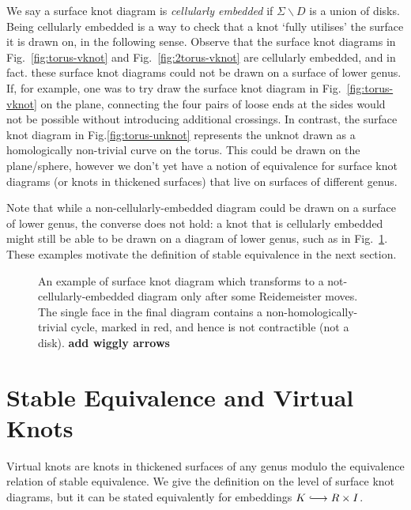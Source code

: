 \documentclass[12pt]{report}
\newcommand{\inject}{\lhook\joinrel\longrightarrow}
\newcommand{\notered}[1]{{\color{Red} \textbf{#1}}}
\begin{document}
We say a surface knot diagram is \textit{cellularly embedded} if $\Sigma \smallsetminus D$ is a union of disks. Being cellularly embedded is a way to check that a knot `fully utilises' the surface it is drawn on, in the following sense. Observe that the surface knot diagrams in Fig.~\ref{fig:torus-vknot} and Fig.~\ref{fig:2torus-vknot} are cellularly embedded, and in fact. these surface knot diagrams could not be drawn on a surface of lower genus. If, for example, one was to try draw the surface knot diagram in Fig.~\ref{fig:torus-vknot} on the plane, connecting the four pairs of loose ends at the sides would not be possible without introducing additional crossings. In contrast, the surface knot diagram in Fig.\ref{fig:torus-unknot} represents the unknot drawn as a homologically non-trivial curve on the torus. This could be drawn on the plane/sphere, however we don't yet have a notion of equivalence for surface knot diagrams (or knots in thickened surfaces) that live on surfaces of different genus.

Note that while a non-cellularly-embedded diagram could be drawn on a surface of lower genus, the converse does not hold: a knot that is cellularly embedded might still be able to be drawn on a diagram of lower genus, such as in Fig.~\ref{fig:cellular-embedding-tricky}. These examples motivate the definition of stable equivalence in the next section.

\begin{figure}[hbt!]
	\centering
	\def\svgscale{0.56}
	
	
	\caption{An example of surface knot diagram which transforms to a not-cellularly-embedded diagram only after some Reidemeister moves. The single face in the final diagram contains a non-homologically-trivial cycle, marked in red, and hence is not contractible (not a disk). \notered{add wiggly arrows}}
	\label{fig:cellular-embedding-tricky}
\end{figure}

\section{Stable Equivalence and Virtual Knots}

Virtual knots are knots in thickened surfaces of any genus modulo the equivalence relation of stable equivalence. We give the definition on the level of surface knot diagrams, but it can be stated equivalently for embeddings $K \inject R \times I$.
\end{document}
